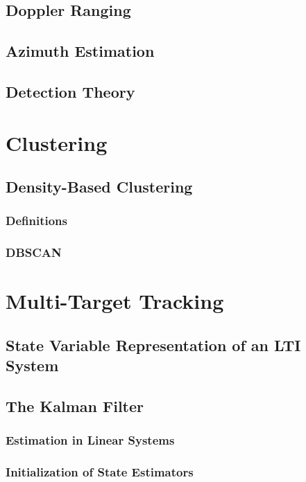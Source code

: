 \documentclass[DIV=15,
fleqn
numbers=noenddot,
headsepline,
captions=tableabove,twoside, openright]{scrreprt}
\begin{document}
\section{Doppler Ranging}\label{bs:dopplerRanging}
\section{Azimuth Estimation}\label{bs:azimuth}
\section{Detection Theory}\label{bs:detection}
\chapter{Clustering}\label{ch:cluster}

\section{Density-Based Clustering}\label{cs:Density}

\subsection{Definitions}\label{cs:Def}

\subsection{DBSCAN}\label{cs:dbscan}

\chapter{Multi-Target Tracking}

\section{State Variable Representation of an LTI System}\label{mtt:state}

\section{The Kalman Filter}\label{mtt:kalman}
 
 \subsection{Estimation in Linear Systems}
 
\subsection{Initialization of State Estimators}

\end{document}
